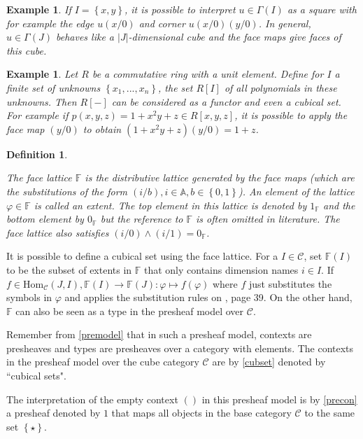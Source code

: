 \documentclass[12pt,a4paper,twoside,xetex]{book}
\newcommand{\keyword}[1]{\emph{#1}\index{#1}}
\newtheorem{definition}[theorem]{Definition}
\newtheorem{example}[theorem]{Example}
\newcommand{\singleton}[0]{\left\{ \star \right\}}
\newcommand{\homo}[3]{\text{Hom}_{#1}\left(#2,#3\right)}
\begin{document}
\begin{example}
If $I = \left\{x,y \right\}$, it is possible to interpret $u \in \Gamma(I)$ as 
a square with for example the edge $u(x/0)$ and corner $u(x/0)(y/0)$. In 
general, $u\in \Gamma (J)$ behaves like a $|J|$-dimensional cube and the face 
maps give faces of this cube.
\end{example}

\begin{example}
Let $R$ be a commutative ring with a unit element. Define for $I$ a finite set 
of unknowns $\left\{x_1 , ..., x_n \right\}$, the set $R[I]$ of all polynomials 
in these unknowns. Then $R[-]$ can be considered as a functor and even a 
cubical set. For example if $p(x,y,z) = 1 + x^2y +z \in R[x,y,z]$, it is 
possible to apply the face map $(y/0)$ to obtain $(1+x^2 y +z ) (y/0) = 1+z$.
\end{example}


\begin{definition}\label{facelattice}

The \keyword{face lattice} $\mathbb{F}$ is the distributive lattice generated 
by the face maps (which are the substitutions of the form $(i/b), i\in 
\mathbb{A}, b \in \left\{ 0,1 \right\}$). An element of the lattice $\varphi 
\in \mathbb{F}$ is called an \keyword{extent}. The top element in this lattice 
is denoted by $1_{\mathbb{F}}$ and the bottom element by $0_{\mathbb{F}}$ but 
the reference to $\mathbb{F}$ is often omitted in literature. The face lattice 
also satisfies $(i/0) \wedge (i/1) = 0_{\mathbb{F}}$. 
\end{definition}


It is possible to define a cubical set using the face lattice. For a $I\in 
\mathcal{C}$, set $\mathbb{F}(I)$ to be the subset of extents in 
$\mathbb{F}$ that only contains dimension names $i \in I$. If $f \in 
\homo{\mathcal{C}}{J}{I}, \mathbb{F}(I) \rightarrow \mathbb{F}(J): \varphi 
\mapsto f(\varphi)$ where $f$ just substitutes the symbols in $\varphi$ and 
applies the substitution rules on \cite{Orton2019}, page 39. On the other hand, 
$\mathbb{F}$ can also be seen as a type in the presheaf model over 
$\mathcal{C}$. 

Remember from \cref{premodel} that in such a presheaf model, contexts are 
presheaves and types are presheaves over a category with elements. The contexts 
in the presheaf model over the cube category $\mathcal{C}$ are by \cref{cubset} 
denoted by ``cubical sets".

The interpretation of the empty context $()$ in this presheaf model is by 
\cref{precon} a presheaf denoted by $1$ that maps all objects in the base 
category $\mathcal{C}$ to the same set $\singleton$. 
\end{document}
